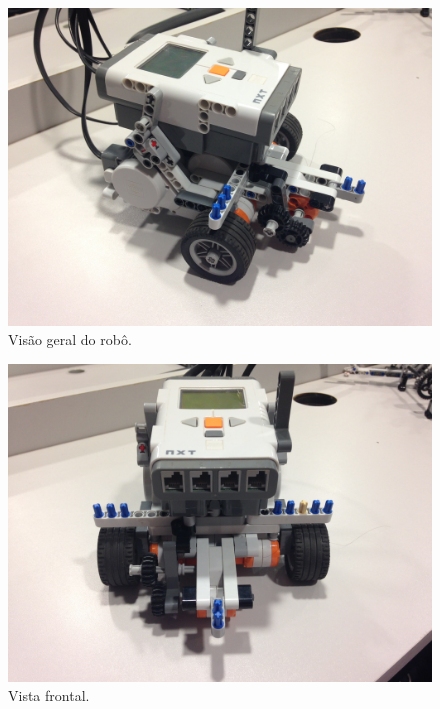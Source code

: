\documentclass{article}
\begin{document}
	\paragraph{}

	\begin{figure}[h!]
		\includegraphics[width=\linewidth]{../Images/robot_1.JPG}
		\caption{Visão geral do robô.}
		\label{fig:robot_1}
	\end{figure}

	\begin{figure}[h!]
		\includegraphics[width=\linewidth]{../Images/robot_2.JPG}
		\caption{Vista frontal.}
		\label{fig:robot_2}
	\end{figure}
\end{document}
